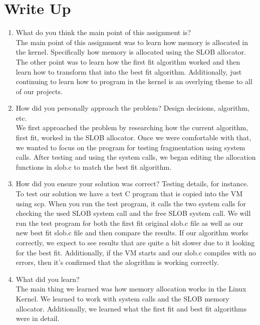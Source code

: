 \documentclass[letterpaper,10pt,draftclsnofoot,onecolumn,titlepage]{IEEEtran}
\begin{document}
\section{Write Up}
\begin{enumerate}
                \item What do you think the main point of this assignment is? \\
The main point of this assignment was to learn how memory is allocated in the kernel. Specifically how memory is allocated using the SLOB allocator. The other point was to learn how the first fit algorithm worked and then learn how to transform that into the best fit algorithm. Additionally, just continuing to learn how to program in the kernel is an overlying theme to all of our projects. 

		 \item How did you personally approach the problem? Design decisions, algorithm, etc. \\
We first approached the problem by researching how the current algorithm, first fit, worked in the SLOB allocator. Once we were comfortable with that, we wanted to focus on the program for testing fragmentation using system calls. After testing and using the system calls, we began editing the allocation functions in slob.c to match the best fit algorithm. 

                \item How did you ensure your solution was correct? Testing details, for instance. \\
To test our solution we have a test C program that is copied into the VM using scp. 
When you run the test program, it calls the two system calls for checking the used SLOB system call and the free SLOB system call. 
We will run the test program for both the first fit original slob.c file as well as our new best fit slob.c file and then compare the results.
If our algorithm works correctly, we expect to see results that are quite a bit slower due to it looking for the best fit. 
Additionally, if the VM starts and our slob.c compiles with no errors, then it's confirmed that the alogrithm is working correctly.   
               
		\item What did you learn? \\
The main thing we learned was how memory allocation works in the Linux Kernel. 
We learned to work with system calls and the SLOB memory allocator. 
Additionally, we learned what the first fit and best fit algorithms were in detail. 


\end{enumerate}
\end{document}
